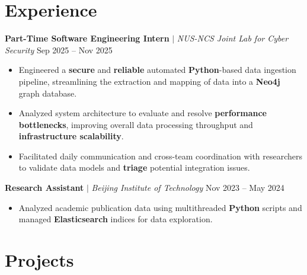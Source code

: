 \documentclass[10pt, letterpaper]{article}
\begin{document}
\section{Experience}

\textbf{Part-Time Software Engineering Intern} $|$ \textit{NUS-NCS Joint Lab for Cyber Security} \hfill Sep 2025 -- Nov 2025
\begin{itemize}[leftmargin=0.2in, itemsep=4pt, parsep=2pt, topsep=4pt]
    \item Engineered a \textbf{secure} and \textbf{reliable} automated \textbf{Python}-based data ingestion pipeline, streamlining the extraction and mapping of data into a \textbf{Neo4j} graph database.
    \item Analyzed system architecture to evaluate and resolve \textbf{performance bottlenecks}, improving overall data processing throughput and \textbf{infrastructure scalability}.
    \item Facilitated daily communication and cross-team coordination with researchers to validate data models and \textbf{triage} potential integration issues.
\end{itemize}
\vspace{8pt}

\textbf{Research Assistant} $|$ \textit{Beijing Institute of Technology} \hfill Nov 2023 -- May 2024
\begin{itemize}[leftmargin=0.2in, itemsep=4pt, parsep=2pt, topsep=4pt]
    \item Analyzed academic publication data using multithreaded \textbf{Python} scripts and managed \textbf{Elasticsearch} indices for data exploration.
\end{itemize}

\section{Projects}
\end{document}
